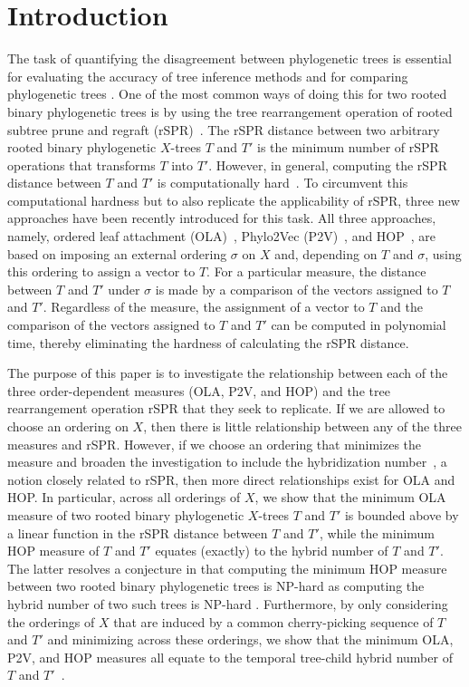 \documentclass{article}
\begin{document}
\section{Introduction}\label{sec:intro}
The task of quantifying the disagreement between phylogenetic trees is essential for evaluating the accuracy of tree inference methods and for comparing phylogenetic trees \cite{kuhner2015practical,stjohn2017}.
One of the most common ways of doing this for two rooted binary phylogenetic trees is by using the tree rearrangement operation of rooted subtree prune and regraft (rSPR)~\cite{sempleSteel}. 
The rSPR distance between two arbitrary rooted binary phylogenetic $X$-trees $T$ and $T'$ is the minimum number of rSPR operations that transforms $T$ into $T'$. 
However, in general, computing the rSPR distance between $T$ and $T'$ is computationally hard~\cite{bordewichSemple2005}. 
To circumvent this computational hardness but to also replicate the applicability of rSPR, three new approaches have been recently introduced for this task. All three approaches, namely, ordered leaf attachment (OLA)~\cite{ola}, Phylo2Vec (P2V)~\cite{penn2024phylo2vec}, and HOP~\cite{hop}, are based on imposing an external ordering $\sigma$ on $X$ and, depending on $T$ and $\sigma$, using this ordering to assign a vector to $T$. For a particular measure, the distance between $T$ and $T'$ under $\sigma$ is made by a comparison of the vectors assigned to $T$ and $T'$. Regardless of the measure, the assignment of a vector to $T$ and the comparison of the vectors assigned to $T$ and $T'$ can be computed in polynomial time, thereby eliminating the hardness of calculating the rSPR distance.

The purpose of this paper is to investigate the relationship between each of the three order-dependent measures (OLA, P2V, and HOP) and the tree rearrangement operation rSPR that they seek to replicate. If we are allowed to choose an ordering on $X$, then there is little relationship between any of the three measures and rSPR. However, if we choose an ordering that minimizes the measure and broaden the investigation to include the hybridization number~\cite{baroni2005bounding}, a notion closely related to rSPR, then more direct relationships exist for OLA and HOP. In particular, across all orderings of $X$, we show that the minimum OLA measure of two rooted binary phylogenetic $X$-trees $T$ and $T'$ is bounded above by a linear function in the rSPR distance between $T$ and $T'$, while the minimum HOP measure of $T$ and $T'$ equates (exactly) to the hybrid number of $T$ and $T'$. The latter resolves a conjecture in \cite{hop} that computing the minimum HOP measure between two rooted binary phylogenetic trees is NP-hard as computing the hybrid number of two such trees is NP-hard \cite{bordewich2007computing}. Furthermore, by only considering the orderings of $X$ that are induced by a common cherry-picking sequence of $T$ and $T'$ and minimizing across these orderings, we show that the minimum OLA, P2V, and HOP measures all equate to the temporal tree-child hybrid number of $T$ and $T'$~\cite{humphries2013cherry}.
\end{document}
